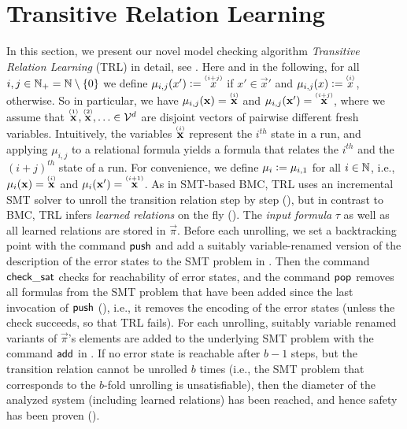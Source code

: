 \section{Transitive Relation Learning}
\label{sec:til}
%
In this section, we present our novel model checking algorithm \emph{Transitive Relation
Learning} (TRL) in detail, see .
%
Here and in the following, for all
$i,j \in \mathbb{N}_+ = \mathbb{N} \setminus \{0\}$
we define $\mu_{i,j}(x') \Def \ind{x}{i+j}$ if $x' \in \vec{x}'$ and $\mu_{i,j}(x) \Def \ind{x}{i}$, otherwise.
%
So in particular, we have $\mu_{i,j}(\vec{x}) = \ind{\vec{x}}{i}$ and $\mu_{i,j}(\vec{x}') = \ind{\vec{x}}{i+j}$, where we assume that $\ind{\vec{x}}{1},\ind{\vec{x}}{2}, \ldots \in \VV^d$ are disjoint vectors of pairwise different fresh variables.
%
Intuitively, the variables $\ind{\vec{x}}{i}$ represent the $i^{th}$ state in a run, and applying $\mu_{i,j}$ to a relational formula yields a formula that relates the $i^{th}$ and the $(i+j)^{th}$ state of a run.
%
For convenience, we define $\mu_{i} \mathrel{\mathop:}= \mu_{i,1}$ for all $i \in \mathbb{N}$, i.e., $\mu_i(\vec{x}) = \ind{\vec{x}}{i}$ and $\mu_i(\vec{x}') = \ind{\vec{x}}{i+1}$.
%
As in SMT-based BMC, TRL uses an incremental SMT solver to unroll the transition relation step by step (), but in contrast to BMC, TRL infers \emph{learned relations} on the fly ().
%
The \emph{input formula} $\tau$ as well as all learned relations are stored in $\vec{\pi}$.
%
Before each unrolling, we set a backtracking point with the command $\mathsf{push}$ and add a suitably variable-renamed version of the description of the error states to the SMT problem in .
%
Then the command $\mathsf{check}\_\mathsf{sat}$ checks for reachability of error states, and the command $\mathsf{pop}$ removes all formulas from the SMT problem that have been added since the last invocation of $\mathsf{push}$ (), i.e., it removes the encoding of the error states (unless the check succeeds, so that TRL fails).
%
For each unrolling, suitably variable renamed variants of $\vec{\pi}$'s elements are added to the underlying SMT problem with the command $\mathsf{add}$ in .
%
If no error state is reachable after $b-1$ steps, but the transition relation cannot be
unrolled $b$ times (i.e., the SMT problem that corresponds to the $b$-fold unrolling is
unsatisfiable), then the diameter of the analyzed system (including learned relations) has
been reached, and hence safety has been proven ().

